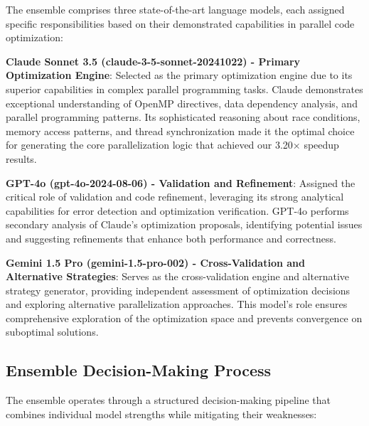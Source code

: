 The ensemble comprises three state-of-the-art language models, each assigned specific responsibilities based on their demonstrated capabilities in parallel code optimization:

\textbf{Claude Sonnet 3.5 (claude-3-5-sonnet-20241022) - Primary Optimization Engine}: Selected as the primary optimization engine due to its superior capabilities in complex parallel programming tasks. Claude demonstrates exceptional understanding of OpenMP directives, data dependency analysis, and parallel programming patterns. Its sophisticated reasoning about race conditions, memory access patterns, and thread synchronization made it the optimal choice for generating the core parallelization logic that achieved our 3.20× speedup results.

\textbf{GPT-4o (gpt-4o-2024-08-06) - Validation and Refinement}: Assigned the critical role of validation and code refinement, leveraging its strong analytical capabilities for error detection and optimization verification. GPT-4o performs secondary analysis of Claude's optimization proposals, identifying potential issues and suggesting refinements that enhance both performance and correctness.

\textbf{Gemini 1.5 Pro (gemini-1.5-pro-002) - Cross-Validation and Alternative Strategies}: Serves as the cross-validation engine and alternative strategy generator, providing independent assessment of optimization decisions and exploring alternative parallelization approaches. This model's role ensures comprehensive exploration of the optimization space and prevents convergence on suboptimal solutions.

\subsection{Ensemble Decision-Making Process}

The ensemble operates through a structured decision-making pipeline that combines individual model strengths while mitigating their weaknesses:

